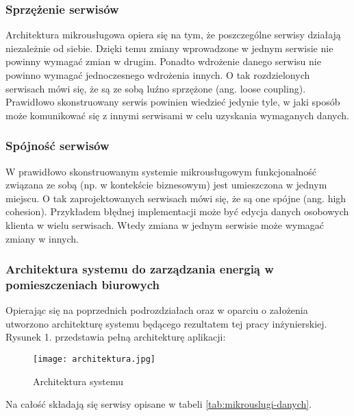 \subsubsection{Sprzężenie serwisów}

Architektura mikrousługowa opiera się na tym, że poszczególne serwisy działają 
niezależnie od siebie. Dzięki temu zmiany wprowadzone w jednym serwisie nie powinny 
wymagać zmian w drugim. Ponadto wdrożenie danego serwisu nie powinno wymagać 
jednoczesnego wdrożenia innych. O tak rozdzielonych serwisach mówi się, że są ze sobą 
luźno sprzężone (ang. loose coupling). Prawidłowo skonstruowany serwis powinien 
wiedzieć jedynie tyle, w jaki sposób może komunikować się z innymi serwisami w celu 
uzyskania wymaganych danych.

\subsubsection{Spójność serwisów}
W prawidłowo skonstruowanym systemie mikrousługowym funkcjonalność związana ze 
sobą (np. w kontekście biznesowym) jest umieszczona w jednym miejscu. O tak 
zaprojektowanych serwisach mówi się, że są one spójne (ang. high cohesion). Przykładem 
błędnej implementacji może być edycja danych osobowych klienta w wielu serwisach. 
Wtedy zmiana w jednym serwisie może wymagać zmiany w innych.

\subsubsection{Architektura systemu do zarządzania energią w pomieszczeniach biurowych}

Opierając się na poprzednich podrozdziałach oraz w oparciu o założenia utworzono 
architekturę systemu będącego rezultatem tej pracy inżynierskiej. Rysunek 1. 
przedstawia pełną architekturę aplikacji:

\begin{figure}[h] %
    \centering %
    \texttt{[image: architektura.jpg]} %
    \caption{Architektura systemu} %
    \label{fig:architektura-systemu} %
\end{figure}

Na całość składają się serwisy opisane w tabeli \ref{tab:mikrouslugi-danych}.

